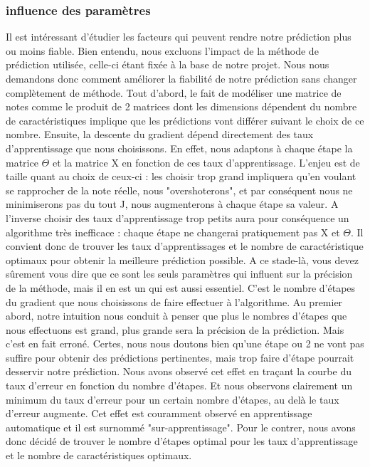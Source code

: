 \documentclass[a4paper,10pt]{article}
\begin{document}
\subsubsection{influence des paramètres}

Il est intéressant d'étudier les facteurs qui peuvent rendre notre prédiction plus ou moins fiable. Bien entendu, nous excluons l'impact de la méthode de prédiction utilisée, celle-ci étant fixée à la base de notre projet. Nous nous demandons donc comment améliorer la fiabilité de notre prédiction sans changer complètement de méthode. Tout d'abord, le fait de modéliser une matrice de notes comme le produit de 2 matrices dont les dimensions dépendent du nombre de caractéristiques implique que les prédictions vont différer suivant le choix de ce nombre. Ensuite, la descente du gradient dépend directement des taux d'apprentissage que nous choisissons. En effet, nous adaptons à chaque étape la matrice $\Theta$ et la matrice X en fonction de ces taux d'apprentissage. L'enjeu est de taille quant au choix de ceux-ci : les choisir trop grand impliquera qu'en voulant se rapprocher de la note réelle, nous "overshoterons", et par conséquent nous ne minimiserons pas du tout J, nous augmenterons à chaque étape sa valeur. A l'inverse choisir des taux d'apprentissage trop petits aura pour conséquence un algorithme très inefficace : chaque étape ne changerai pratiquement pas X et $\Theta$. Il convient donc de trouver les taux d'apprentissages et le nombre de caractéristique optimaux pour obtenir la meilleure prédiction possible. A ce stade-là, vous devez sûrement vous dire que ce sont les seuls paramètres qui influent sur la précision de la méthode, mais il en est un qui est aussi essentiel. C'est le nombre d'étapes du gradient que nous choisissons de faire effectuer à l'algorithme. Au premier abord, notre intuition nous conduit à penser que plus le nombres d'étapes que nous effectuons est grand, plus grande sera la précision de la prédiction. Mais c'est en fait erroné. Certes, nous nous doutons bien qu'une étape ou 2 ne vont pas suffire pour obtenir des prédictions pertinentes, mais trop faire d'étape pourrait desservir notre prédiction. Nous avons observé cet effet en traçant la courbe du taux d'erreur en fonction du nombre d'étapes. Et nous observons clairement un minimum du taux d'erreur pour un certain nombre d'étapes, au delà le taux d'erreur augmente. Cet effet est couramment observé en apprentissage automatique et il est surnommé "sur-apprentissage". Pour le contrer, nous avons donc décidé de trouver le nombre d'étapes optimal pour les taux d'apprentissage et le nombre de caractéristiques optimaux.
\end{document}
